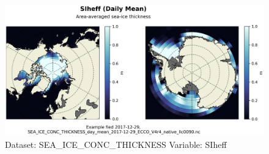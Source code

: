 \begin{figure}[H]
\centering
\includegraphics[width=\textwidth]{../images/plots/native_plots/Sea-Ice_and_Snow_Concentration_and_Thickness/SIheff.png}
\caption{Dataset: SEA\_ICE\_CONC\_THICKNESS Variable: SIheff}
\label{tab:table-SEA_ICE_CONC_THICKNESS_SIheff-Plot}
\end{figure}
\pagebreak
